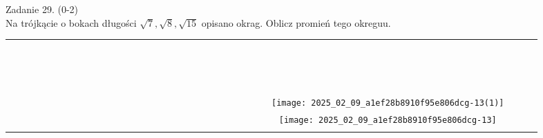 \documentclass[10pt]{article}
\begin{document}
Zadanie 29. (0-2)\\
Na trójkącie o bokach długości \(\sqrt{7}, \sqrt{8}, \sqrt{15}\) opisano okrag. Oblicz promień tego okreguu.

\begin{center}
\begin{tabular}{|c|c|c|c|c|c|c|c|c|c|c|c|c|c|c|c|c|c|c|c|c|c|c|c|c|c|c|c|c|c|c|}
\hline
 &  &  &  &  &  &  &  &  &  &  &  &  &  &  &  &  &  &  &  &  &  &  &  &  &  &  &  &  &  &  \\
\hline
 &  &  &  &  &  &  &  &  &  &  &  &  &  &  &  &  &  &  &  &  &  &  &  &  &  &  &  &  &  &  \\
\hline
 &  &  &  &  &  &  &  &  &  &  &  &  &  &  &  &  &  &  &  &  &  &  &  &  &  &  &  &  &  &  \\
\hline
 &  &  &  &  &  &  &  &  &  &  &  &  &  &  &  &  &  &  &  &  &  &  &  &  &  &  &  &  &  &  \\
\hline
 &  &  &  &  &  &  &  &  &  &  &  &  &  &  &  &  &  &  &  &  &  &  &  &  &  &  &  &  &  &  \\
\hline
 &  &  &  &  &  &  &  &  &  &  &  &  &  &  &  &  &  &  &  &  &  &  &  &  &  &  &  &  &  &  \\
\hline
 &  &  &  &  &  &  &  &  &  &  &  &  &  &  &  &  &  &  &  &  &  &  &  &  &  &  &  &  &  &  \\
\hline
 &  &  &  &  &  &  &  &  &  &  &  &  &  &  &  &  &  &  &  &  &  &  &  &  &  &  &  &  &  &  \\
\hline
 &  &  &  &  &  &  &  &  &  &  &  &  &  &  &  &  &  &  &  &  &  &  &  &  &  &  &  &  &  &  \\
\hline
 &  &  &  &  &  &  &  &  &  &  &  &  &  &  &  &  &  &  &  &  &  &  &  &  &  &  &  &  &  &  \\
\hline
 &  &  &  &  &  &  &  &  &  &  &  &  &  &  &  &  &  &  &  &  &  &  &  &  &  &  &  &  &  &  \\
\hline
 &  &  &  &  &  &  &  &  &  &  &  &  &  &  &  &  &  &  &  &  &  &  &  &  &  &  &  &  &  &  \\
\hline
 &  &  &  &  &  &  &  &  &  &  &  &  &  &  &  &  &  &  &  &  &  &  &  &  &  &  &  &  &  &  \\
\hline
 &  &  &  &  &  &  &  &  &  &  &  &  &  &  &  &  &  &  &  &  &  &  &  &  &  &  &  &  &  &  \\
\hline
 &  &  &  &  &  &  &  &  &  &  &  &  &  &  &  &  &  &  &  &  &  &  &  &  &  &  &  &  &  &  \\
\hline
 &  &  &  &  &  &  &  &  &  &  &  &  &  &  &  &  &  &  &  &  &  &  &  &  &  &  &  &  &  &  \\
\hline
 &  &  &  &  &  &  &  &  &  &  &  &  &  &  &  &  &  &  &  &  &  &  &  &  &  &  & \texttt{[image: 2025\_02\_09\_a1ef28b8910f95e806dcg-13(1)]}
 &  &  &  \\
\hline
 &  &  &  &  &  &  &  &  &  &  &  &  &  &  &  &  &  &  &  &  &  &  &  &  &  &  & \texttt{[image: 2025\_02\_09\_a1ef28b8910f95e806dcg-13]}
 &  &  &  \\
\hline
 &  &  &  &  &  &  &  &  &  &  &  &  &  &  &  &  &  &  &  &  &  &  &  &  &  &  &  &  &  &  \\
\hline
\end{tabular}
\end{center}
\end{document}
